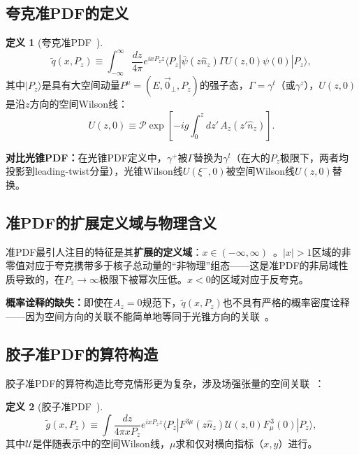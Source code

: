 \documentclass[12pt,a4paper]{ctexart}
\theoremstyle{definition}
\newtheorem{definition}{定义}[section]
\begin{document}
\subsection{夸克准PDF的定义}

\begin{definition}[夸克准PDF~\cite{Ji2013Euclidean,Izubuchi2018}]
\begin{equation}
\boxed{\tilde q(x, P_z) \equiv \int_{-\infty}^{\infty} \frac{dz}{4\pi} e^{ixP_z z} \langle P_z | \bar\psi(z\hat n_z) \Gamma U(z, 0) \psi(0) | P_z \rangle},
\label{eq:quasi_PDF_def}
\end{equation}
其中$|P_z\rangle$是具有大空间动量$P^\mu = (E, \vec 0_\perp, P_z)$的强子态，$\Gamma = \gamma^t$（或$\gamma^z$），$U(z,0)$是沿$z$方向的空间Wilson线：
\begin{equation}
U(z,0) \equiv \mathcal{P}\exp\!\left[-ig\int_0^z dz'\, A_z(z'\hat n_z)\right].
\label{eq:spatial_WL}
\end{equation}
\end{definition}

\textbf{对比光锥PDF：}在光锥PDF定义中，$\gamma^+$被$\Gamma$替换为$\gamma^t$（在大的$P_z$极限下，两者均投影到leading-twist分量），光锥Wilson线$U(\xi^-,0)$被空间Wilson线$U(z,0)$替换。

\subsection{准PDF的扩展定义域与物理含义}

准PDF最引人注目的特征是其\textbf{扩展的定义域}：$x \in (-\infty, \infty)$~\cite{Ji2013Euclidean,Izubuchi2018}。$|x| > 1$区域的非零值对应于夸克携带多于核子总动量的``非物理''组态——这是准PDF的非局域性质导致的，在$P_z \to \infty$极限下被幂次压低。$x < 0$的区域对应于反夸克。

\textbf{概率诠释的缺失：}即使在$A_z = 0$规范下，$\tilde q(x, P_z)$也不具有严格的概率密度诠释——因为空间方向的关联不能简单地等同于光锥方向的关联~\cite{Ji2014LaMET}。

\subsection{胶子准PDF的算符构造}

胶子准PDF的算符构造比夸克情形更为复杂，涉及场强张量的空间关联~\cite{Ji2013Euclidean,Fan2018gluonQuasi}：

\begin{definition}[胶子准PDF~\cite{Ji2013Euclidean}]
\begin{equation}
\tilde g(x, P_z) \equiv \int \frac{dz}{4\pi x P_z} e^{ixP_z z} \langle P_z | F^{3\mu}(z\hat n_z) \mathcal{U}(z,0) F_\mu^{\,3}(0) | P_z \rangle,
\label{eq:quasi_gluon_PDF}
\end{equation}
其中$\mathcal{U}$是伴随表示中的空间Wilson线，$\mu$求和仅对横向指标（$x,y$）进行。
\end{definition}
\end{document}
